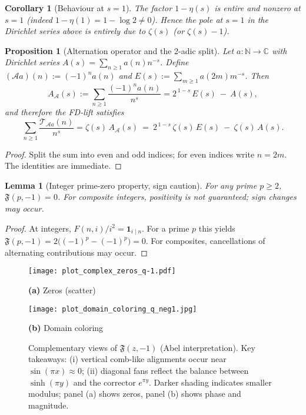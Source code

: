 \documentclass[11pt,a4paper]{amsart}
\newcommand{\C}{\mathbb{C}}
\newcommand{\N}{\mathbb{N}}
\theoremstyle{plain}
\newtheorem{lemma}[theorem]{Lemma}
\newtheorem{proposition}[theorem]{Proposition}
\newtheorem{corollary}[theorem]{Corollary}
\theoremstyle{definition}
\theoremstyle{remark}
\begin{document}
\begin{corollary}[Behaviour at \(s=1\)]\label{cor:qminus1-s1}
The factor \(1-\eta(s)\) is entire and nonzero at \(s=1\) (indeed \(1-\eta(1)=1-\log2\neq0\)).
Hence the pole at \(s=1\) in the Dirichlet series above is entirely due to \(\zeta(s)\) (or \(\zeta(s)-1\)).
\end{corollary}

\begin{proposition}[Alternation operator and the 2-adic split]\label{prop:alternation-operator}
Let \(a:\N\to\C\) with Dirichlet series \(A(s)=\sum_{n\ge1}a(n)n^{-s}\). Define \((\mathcal A a)(n):=(-1)^n a(n)\) and \(E(s):=\sum_{m\ge1}a(2m)m^{-s}\).
Then
\[
A_{\mathcal A}(s):=\sum_{n\ge1}\frac{(-1)^n a(n)}{n^s}
= 2^{\,1-s}\,E(s)\ -\ A(s),
\]
and therefore the FD-lift satisfies
\[
\sum_{n\ge1}\frac{\mathcal T_{\mathcal A a}(n)}{n^s}
=\zeta(s)\,A_{\mathcal A}(s)\ =\ 2^{\,1-s}\,\zeta(s)\,E(s)\ -\ \zeta(s)\,A(s).
\]
\end{proposition}


\begin{proof}
Split the sum into even and odd indices; for even indices write \(n=2m\). The identities are immediate.
\end{proof}

\begin{lemma}[Integer prime-zero property, sign caution]\label{lem:qminus1-prime-zero}
For any prime \(p\ge2\),
\(\mathfrak F(p,-1)=0\).
For composite integers, positivity is not guaranteed; sign changes may occur.
\end{lemma}

\begin{proof}
At integers, \(F(n,i)/i^2=\mathbf 1_{i\mid n}\). For a prime \(p\) this yields
\(\mathfrak F(p,-1)=2\bigl((-1)^p-(-1)^p\bigr)=0\).
For composites, cancellations of alternating contributions may occur.
\end{proof}

\begin{figure}[t]
\centering
\begin{minipage}[t]{0.49\textwidth}
\centering
\texttt{[image: plot\_complex\_zeros\_q-1.pdf]}
\par\smallskip\small\textbf{(a)} Zeros (scatter)
\label{fig:complex_zeros_qminus1}
\end{minipage}\hfill
\begin{minipage}[t]{0.49\textwidth}
\centering
\texttt{[image: plot\_domain\_coloring\_q\_neg1.jpg]}
\par\small\textbf{(b)} Domain coloring
\label{fig:domain_coloring_qminus1}
\end{minipage}
\caption{Complementary views of $\mathfrak{F}(z,-1)$ (Abel interpretation). Key takeaways: (i) vertical comb-like alignments occur near $\sin(\pi x)\approx 0$; (ii) diagonal fans reflect the balance between $\sinh(\pi y)$ and the corrector $e^{\pi y}$. Darker shading indicates smaller modulus; panel (a) shows zeros, panel (b) shows phase and magnitude.}
\end{figure}
\end{document}
